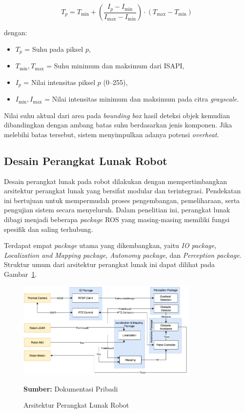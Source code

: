 \begin{equation}
T_p = T_{\text{min}} + \left( \frac{I_p - I_{\text{min}}}{I_{\text{max}} - I_{\text{min}}} \right) \cdot (T_{\text{max}} - T_{\text{min}})
\end{equation}

\noindent dengan:
\begin{itemize}
    \item $T_p$ = Suhu pada piksel $p$,
    \item $T_{\text{min}}, T_{\text{max}}$ = Suhu minimum dan maksimum dari ISAPI,
    \item $I_p$ = Nilai intensitas piksel $p$ (0–255),
    \item $I_{\text{min}}, I_{\text{max}}$ = Nilai intensitas minimum dan maksimum pada citra \emph{grayscale}.
\end{itemize}

Nilai suhu aktual dari area pada \emph{bounding box} hasil deteksi objek kemudian dibandingkan dengan ambang batas suhu berdasarkan jenis komponen. Jika melebihi batas tersebut, sistem menyimpulkan adanya potensi \emph{overheat}.





\subsection{Desain Perangkat Lunak Robot}
Desain perangkat lunak pada robot dilakukan dengan mempertimbangkan arsitektur perangkat lunak yang bersifat modular dan terintegrasi. Pendekatan ini bertujuan untuk mempermudah proses pengembangan, pemeliharaan, serta pengujian sistem secara menyeluruh. Dalam penelitian ini, perangkat lunak dibagi menjadi beberapa \textit{package} ROS yang masing-masing memiliki fungsi spesifik dan saling terhubung.

Terdapat empat \textit{package} utama yang dikembangkan, yaitu \textit{IO package}, \textit{Localization and Mapping package}, \textit{Autonomy package}, dan \textit{Perception package}. Struktur umum dari arsitektur perangkat lunak ini dapat dilihat pada Gambar~\ref{fig:software-arch}.

\begin{figure}[H]
  \centering
  \includegraphics[width=0.8\textwidth]{gambar/bab3/sotware-arch.png}
  \caption{Arsitektur Perangkat Lunak Robot}
  \label{fig:software-arch}
  \footnotesize{\textbf{Sumber:} Dokumentasi Pribadi}
\end{figure}

